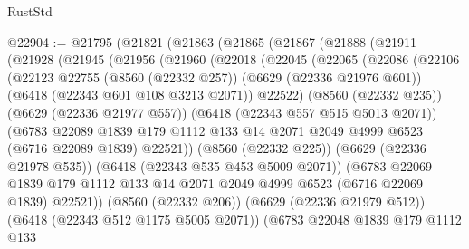 \begin{lexlean}{RustStd}
\begin{coremodule}
@22904 := @21795
    (@21821
      (@21863
        (@21865
          (@21867
            (@21888
              (@21911
                (@21928
                  (@21945
                    (@21956
                      (@21960
                        (@22018
                          (@22045
                            (@22065
                              (@22086
                                (@22106
                                  (@22123
                                    @22755
                                    (@8560 (@22332 @257))
                                    (@6629 (@22336 @21976 @601))
                                    (@6418 (@22343 @601 @108 @3213 @2071))
                                    @22522)
                                  (@8560 (@22332 @235))
                                  (@6629 (@22336 @21977 @557))
                                  (@6418 (@22343 @557 @515 @5013 @2071))
                                  (@6783
                                    @22089
                                    @1839
                                    @179
                                    @1112
                                    @133
                                    @14
                                    @2071
                                    @2049
                                    @4999
                                    @6523
                                    (@6716 @22089 @1839)
                                    @22521))
                                (@8560 (@22332 @225))
                                (@6629 (@22336 @21978 @535))
                                (@6418 (@22343 @535 @453 @5009 @2071))
                                (@6783
                                  @22069
                                  @1839
                                  @179
                                  @1112
                                  @133
                                  @14
                                  @2071
                                  @2049
                                  @4999
                                  @6523
                                  (@6716 @22069 @1839)
                                  @22521))
                              (@8560 (@22332 @206))
                              (@6629 (@22336 @21979 @512))
                              (@6418 (@22343 @512 @1175 @5005 @2071))
                              (@6783
                                @22048
                                @1839
                                @179
                                @1112
                                @133

\end{coremodule}
\end{lexlean}
